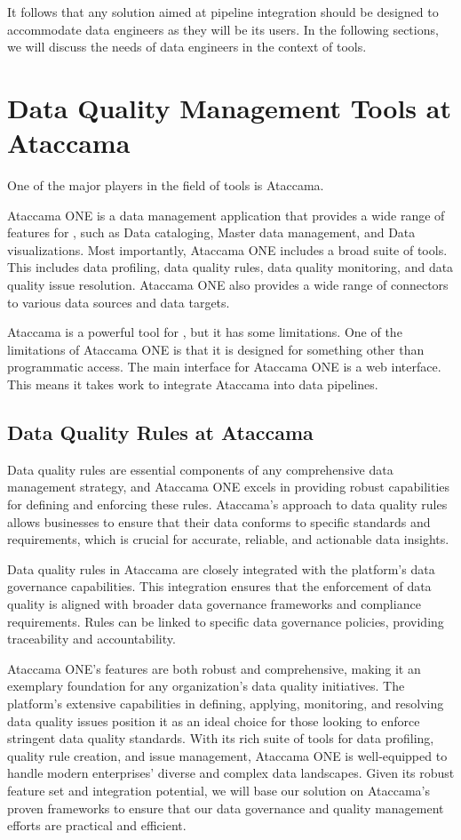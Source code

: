  It follows that any solution aimed at pipeline integration should be designed to accommodate data engineers as they will be its users. In the following sections, we will discuss the needs of data engineers in the context of  tools.

\section{Data Quality Management Tools at Ataccama}

One of the major players in the field of  tools is Ataccama. 

Ataccama ONE is a data management application that provides a wide range of features for , such as Data cataloging, Master data management, and Data visualizations. Most importantly, Ataccama ONE includes a broad suite of  tools. This includes data profiling, data quality rules, data quality monitoring, and data quality issue resolution. Ataccama ONE also provides a wide range of connectors to various data sources and data targets.

Ataccama is a powerful tool for , but it has some limitations. One of the limitations of Ataccama ONE is that it is designed for something other than programmatic access. The main interface for Ataccama ONE is a web interface. This means it takes work to integrate Ataccama into data pipelines.


\subsection{Data Quality Rules at Ataccama}

Data quality rules are essential components of any comprehensive data management strategy, and Ataccama ONE excels in providing robust capabilities for defining and enforcing these rules. Ataccama's approach to data quality rules allows businesses to ensure that their data conforms to specific standards and requirements, which is crucial for accurate, reliable, and actionable data insights.

Data quality rules in Ataccama are closely integrated with the platform's data governance capabilities. This integration ensures that the enforcement of data quality is aligned with broader data governance frameworks and compliance requirements. Rules can be linked to specific data governance policies, providing traceability and accountability.

Ataccama ONE's  features are both robust and comprehensive, making it an exemplary foundation for any organization's data quality initiatives. The platform's extensive capabilities in defining, applying, monitoring, and resolving data quality issues position it as an ideal choice for those looking to enforce stringent data quality standards. With its rich suite of tools for data profiling, quality rule creation, and issue management, Ataccama ONE is well-equipped to handle modern enterprises' diverse and complex data landscapes. Given its robust feature set and integration potential, we will base our solution on Ataccama's proven frameworks to ensure that our data governance and quality management efforts are practical and efficient.

